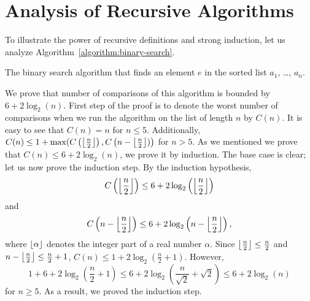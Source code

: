 \section{Analysis of Recursive Algorithms}
To illustrate the power of recursive definitions and strong induction, let us
analyze Algorithm~\ref{algorithm:binary-search}.
\begin{algorithm}
  \begin{algorithmic}[1]
            \State{}
           \EndIf
        \EndFor
      \Else
          \State{}
        \Else
          \State{}
        \EndIf
      \EndIf
    \EndFunction
  \end{algorithmic}
  \caption{The binary search algorithm that finds an element $e$ in the sorted
    list $a_1$, \dots, $a_n$.}
  \label{algorithm:binary-search}
\end{algorithm}
We prove that number of comparisons of this algorithm is bounded by
$6 + 2\log_2(n)$. First step of the proof is to denote the worst
number of comparisons when we run the algorithm on the list of length $n$ by
$C(n)$. It is easy to see that $C(n) = n$ for $n \le 5$. Additionally,
$C(n) \le 1 +
  \max(C\left(\left\lfloor {\frac{n}{2}} \right\rfloor\right),
        C\left(n - \left\lfloor {\frac{n}{2}} \right\rfloor)\right)$
for $n > 5$. As we mentioned we prove that $C(n) \le 6 + 2\log_2(n)$, we prove
it by induction. The base case is clear; let us now prove the induction step.
By the induction hypothesis,
\[
  C\left(\left\lfloor {\frac{n}{2}} \right\rfloor\right) \le
    6 + 2\log_2\left(\left\lfloor {\frac{n}{2}} \right\rfloor\right)
\]
and
\[
  C\left(n - \left\lfloor {\frac{n}{2}} \right\rfloor\right) \le
    6 + 2\log_2\left(n - \left\lfloor {\frac{n}{2}} \right\rfloor\right),
\]
where $\left\lfloor {\alpha} \right\rfloor$ denotes the integer part of a real number $\alpha$.
Since $\left\lfloor {\frac{n}{2}} \right\rfloor \le \frac{n}{2}$ and $n - \left\lfloor {\frac{n}{2}} \right\rfloor \le
\frac{n}{2} + 1$, $C(n) \le 1 + 2\log_2(\frac{n}{2} + 1)$.
However,
\[
    1 + 6 + 2\log_2\left(\frac{n}{2} + 1\right) \le
    6 + 2\log_2\left(\frac{n}{\sqrt{2}} + \sqrt{2}\right) \le 6 + 2 \log_2(n)
\]
for $n \ge 5$. As a result, we proved the induction step.


